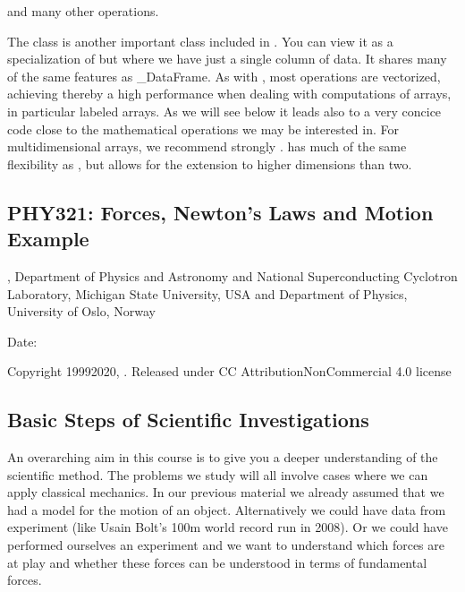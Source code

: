 \documentclass[letterpaper,10pt,english]{sphinxmanual}
\begin{document}
and many other operations.

The  class is another important class included in
. You can view it as a specialization of  but where
we have just a single column of data. It shares many of the same features as \_DataFrame. As with ,
most operations are vectorized, achieving thereby a high performance when dealing with computations of arrays, in particular labeled arrays.
As we will see below it leads also to a very concice code close to the mathematical operations we may be interested in.
For multidimensional arrays, we recommend strongly .  has much of the same flexibility as , but allows for the extension to higher dimensions than two.




\subsection{PHY321: Forces, Newton’s Laws and Motion Example}
\label{\detokenize{chapter3:phy321-forces-newton-s-laws-and-motion-example}}\label{\detokenize{chapter3::doc}}




, Department of Physics and Astronomy and National Superconducting Cyclotron Laboratory, Michigan State University, USA and Department of Physics, University of Oslo, Norway









Date: 

Copyright 1999\sphinxhyphen{}2020, . Released under CC Attribution\sphinxhyphen{}NonCommercial 4.0 license


\subsection{Basic Steps of Scientific Investigations}
\label{\detokenize{chapter3:basic-steps-of-scientific-investigations}}
An overarching aim in this course is to give you a deeper
understanding of the scientific method. The problems we study will all
involve cases where we can apply classical mechanics. In our previous
material we already assumed that we had a model for the motion of an
object.  Alternatively we could have data from experiment (like Usain
Bolt’s 100m world record run in 2008).  Or we could have performed
ourselves an experiment and we want to understand which forces are at
play and whether these forces can be understood in terms of
fundamental forces.
\end{document}
